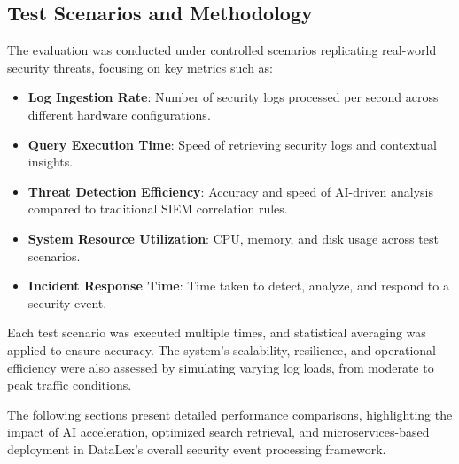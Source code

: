\subsection{Test Scenarios and Methodology}
\label{subsec_test_scenarios_and_methodology}

The evaluation was conducted under controlled scenarios replicating real-world security threats, focusing on key metrics such as:

\begin{itemize}
    \item \textbf{Log Ingestion Rate}: Number of security logs processed per second across different hardware configurations.
    \item \textbf{Query Execution Time}: Speed of retrieving security logs and contextual insights.
    \item \textbf{Threat Detection Efficiency}: Accuracy and speed of AI-driven analysis compared to traditional SIEM correlation rules.
    \item \textbf{System Resource Utilization}: CPU, memory, and disk usage across test scenarios.
    \item \textbf{Incident Response Time}: Time taken to detect, analyze, and respond to a security event.
\end{itemize}

Each test scenario was executed multiple times, and statistical averaging was applied to ensure accuracy. The system's scalability, resilience, and operational efficiency were also assessed by simulating varying log loads, from moderate to peak traffic conditions.

The following sections present detailed performance comparisons, highlighting the impact of AI acceleration, optimized search retrieval, and microservices-based deployment in DataLex's overall security event processing framework.
